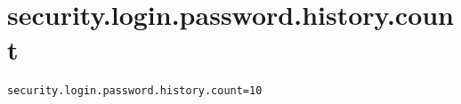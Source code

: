 \section{security.login.password.history.count}
\label{configuration:SecurityLoginPasswordHistoryCount}
\ClearAPI
\TODO
{}
\begin{lstlisting}[style=Props,caption={Usage example for \textit{security.login.password.history.count}}]
security.login.password.history.count=10
\end{lstlisting}
